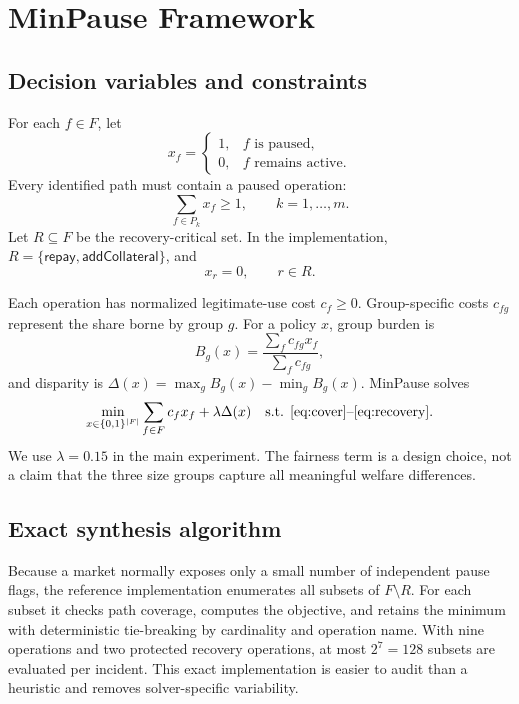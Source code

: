 \documentclass[sn-vancouver,Numbered]{sn-jnl}
\begin{document}
\section{MinPause Framework}
\subsection{Decision variables and constraints}
For each $f\in F$, let
\[
x_f=\begin{cases}1,&f\text{ is paused},\\0,&f\text{ remains active}.
\end{cases}
\]
Every identified path must contain a paused operation:
\begin{equation}
\sum_{f\in P_k}x_f\geq1,\qquad k=1,\ldots,m.
\label{eq:cover}
\end{equation}
Let $R\subseteq F$ be the recovery-critical set.  In the implementation,
$R=\{\textsf{repay},\textsf{addCollateral}\}$, and
\begin{equation}
x_r=0,\qquad r\in R.
\label{eq:recovery}
\end{equation}

Each operation has normalized legitimate-use cost $c_f\geq0$.  Group-specific costs $c_{fg}$ represent the share borne by group $g$.  For a policy $x$, group burden is
\[
B_g(x)=\frac{\sum_f c_{fg}x_f}{\sum_f c_{fg}},
\]
and disparity is $\Delta(x)=\max_gB_g(x)-\min_gB_g(x)$.  MinPause solves
\begin{equation}
\min_{x\in\{0,1\}^{|F|}}
\sum_{f\in F}c_fx_f+\lambda\Delta(x)
\quad\text{s.t. \eqref{eq:cover}--\eqref{eq:recovery}.}
\label{eq:objective}
\end{equation}
We use $\lambda=0.15$ in the main experiment.  The fairness term is a design choice, not a claim that the three size groups capture all meaningful welfare differences.

\subsection{Exact synthesis algorithm}
Because a market normally exposes only a small number of independent pause flags, the reference implementation enumerates all subsets of $F\setminus R$.  For each subset it checks path coverage, computes the objective, and retains the minimum with deterministic tie-breaking by cardinality and operation name.  With nine operations and two protected recovery operations, at most $2^7=128$ subsets are evaluated per incident.  This exact implementation is easier to audit than a heuristic and removes solver-specific variability.
\end{document}
